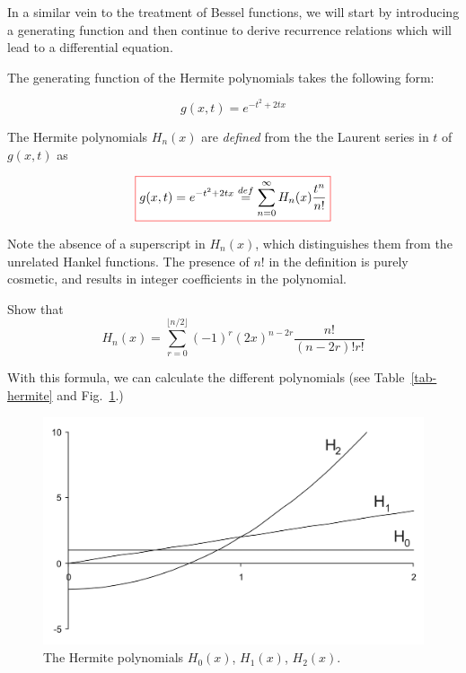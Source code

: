 In a similar vein to the treatment of Bessel functions, we will start by introducing a generating function and then continue to derive recurrence relations which will lead to a differential equation.

\pagebreak


The generating function of the Hermite polynomials takes the following form:

\begin{equation}
g(x,t) = e^{-t^2 + 2tx} \label{eq-gen-hermite}
\end{equation}

The Hermite polynomials $H_n(x)$ are \emph{defined} from the the Laurent series in $t$ of $g(x,t)$ as 

\begin{equation}
\fbox{$\displaystyle
  g(x,t) = e^{-t^2 + 2tx} \stackrel{def}{=} \sum_{n = 0}^{\infty} H_n(x)\frac{t^n}{n!} \label{eq-g-hermite}
$}
\end{equation} 

\noindent{}Note the absence of a superscript in $H_n(x)$, which distinguishes them from the unrelated Hankel functions. The presence of $n!$ in the definition is purely cosmetic, and results in integer coefficients in the polynomial.

\begin{exer}
\noindent{}Show that
$$H_n(x) = \sum_{r=0}^{\lfloor n/2 \rfloor}(-1)^r {(2x)}^{n-2r} \frac{n!}{(n-2r)! r!}$$
\end{exer}

With this formula, we can calculate the different polynomials (see Table~\ref{tab-hermite} and Fig.~\ref{fig-hermite}.)

\begin{figure}
\centering
\includegraphics[scale=0.7]{hermite/figures/hermite}
\caption{The Hermite polynomials $H_0(x)$, $H_1(x)$, $H_2(x)$.}
\label{fig-hermite}
\end{figure}

